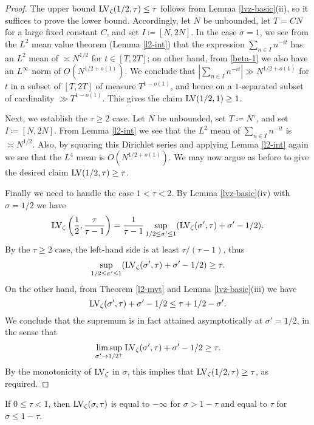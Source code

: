 \begin{proof}  The upper bound $\mathrm{LV}_\zeta(1/2,\tau) \leq \tau$  follows from Lemma \ref{lvz-basic}(ii), so it suffices to prove the lower bound.  Accordingly, let $N$ be unbounded, let $T  = CN$ for a large fixed constant $C$, and set $I \coloneqq [N,2N]$.  In the case $\sigma=1$, we see from the $L^2$ mean value theorem (Lemma \ref{l2-int}) that the expression $\sum_{n \in I} n^{-it}$ has an $L^2$ mean of $\asymp N^{1/2}$ for $t \in [T,2T]$; on other hand, from \eqref{beta-1} we also have an $L^\infty$ norm of $O(N^{1/2+o(1)})$.  We conclude that $|\sum_{n \in I} n^{-it}| \gg N^{1/2+o(1)}$ for $t$ in a subset of $[T,2T]$ of measure $T^{1-o(1)}$, and hence on a $1$-separated subset of cardinality $\gg T^{1-o(1)}$.  This gives the claim $\mathrm{LV}(1/2,1) \geq 1$.

Next, we establish the $\tau \geq 2$ case.
Let $N$ be unbounded, set $T \coloneqq N^\tau$, and set $I \coloneqq [N,2N]$.  From Lemma \ref{l2-int} we see that the $L^2$ mean of $\sum_{n \in I} n^{-it}$ is $\asymp N^{1/2}$.  Also, by squaring this Dirichlet series and applying Lemma \ref{l2-int} again we see that the $L^4$ mean is $O(N^{1/2+o(1)})$.  We may now argue as before to give the desired claim $\mathrm{LV}(1/2,\tau) \geq \tau$.

Finally we need to handle the case $1 < \tau < 2$. By Lemma \ref{lvz-basic}(iv) with $\sigma=1/2$ we have
$$ \mathrm{LV}_\zeta\left(\frac{1}{2}, \frac{\tau}{\tau-1}\right) = \frac{1}{\tau-1}  \sup_{1/2 \leq \sigma' \leq 1} (\mathrm{LV}_\zeta(\sigma',\tau) + \sigma'-1/2).$$
By the $\tau \geq 2$ case, the left-hand side is at least $\tau/(\tau-1)$, thus
$$ \sup_{1/2 \leq \sigma' \leq 1} (\mathrm{LV}_\zeta(\sigma',\tau) + \sigma'-1/2) \geq \tau.$$
On the other hand, from Theorem \ref{l2-mvt} and Lemma \ref{lvz-basic}(iii) we have
$$ \mathrm{LV}_\zeta(\sigma',\tau) + \sigma'-1/2 \leq \tau + 1/2 - \sigma'.$$
We conclude that the supremum is in fact attained asymptotically at $\sigma'=1/2$, in the sense that
$$ \limsup_{\sigma' \to 1/2^+} \mathrm{LV}_\zeta(\sigma',\tau) + \sigma'-1/2 \geq \tau.$$
By the monotonicity of $\mathrm{LV}_\zeta$ in $\sigma$, this implies that $\mathrm{LV}_\zeta(1/2,\tau) \geq \tau$, as required.
\end{proof}

\begin{lemma}\label{lvz-small-tau} If $0 \leq \tau < 1$, then $\mathrm{LV}_\zeta(\sigma,\tau)$ is equal to $-\infty$ for $\sigma > 1-\tau$ and equal to $\tau$ for $\sigma \leq 1-\tau$.
\end{lemma}

